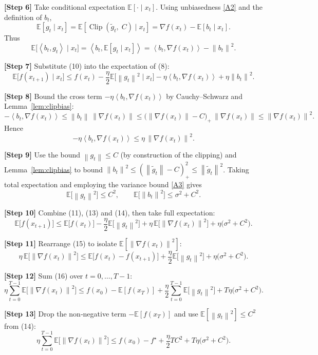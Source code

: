 \documentclass{article}
\newcommand{\clip}[2]{\operatorname{Clip}\!\left(#1,\;#2\right)}
\newcommand{\E}{\mathbb{E}}
\newcommand{\norm}[1]{\left\|#1\right\|}
\newcommand{\inner}[2]{\left\langle #1,#2\right\rangle}
\begin{document}
\noindent\textbf{[Step 6]} Take conditional expectation $\E[\cdot\mid x_t]$.
Using unbiasedness \eqref{A2} and the definition of $b_t$,
\[
\E[g_t\mid x_t]=\E[\clip{\tilde g_t}{C}\mid x_t]
= \nabla f(x_t)-\E[b_t\mid x_t].
\tag{9}
\]
Thus
\[
\E\big[\inner{b_t}{g_t}\mid x_t\big]
= \inner{b_t}{\E[g_t\mid x_t]}
= \inner{b_t}{\nabla f(x_t)}-\norm{b_t}^{2}.
\tag{10}
\]

\noindent\textbf{[Step 7]} Substitute (10) into the expectation of (8):
\[
\E\big[f(x_{t+1})\mid x_t\big]
\le f(x_t)-\frac{\eta}{2}\E\!\big[\norm{g_t}^{2}\mid x_t\big]
-\eta\inner{b_t}{\nabla f(x_t)}+\eta\norm{b_t}^{2}.
\tag{11}
\]

\noindent\textbf{[Step 8]} Bound the cross term $-\eta\inner{b_t}{\nabla f(x_t)}$
by Cauchy–Schwarz and Lemma~\ref{lem:clipbias}:
\[
-\inner{b_t}{\nabla f(x_t)}
\le \norm{b_t}\,\norm{\nabla f(x_t)}
\le \big(\norm{\nabla f(x_t)}-C\big)_{+}\,\norm{\nabla f(x_t)}
\le \norm{\nabla f(x_t)}^{2}.
\tag{12}
\]
Hence
\[
-\eta\inner{b_t}{\nabla f(x_t)}\le \eta\,\norm{\nabla f(x_t)}^{2}.
\tag{13}
\]

\noindent\textbf{[Step 9]} Use the bound $\norm{g_t}\le C$ (by construction of the clipping)
and Lemma~\ref{lem:clipbias} to bound $\norm{b_t}^{2}\le (\norm{\tilde g_t}-C)_{+}^{2}\le
\norm{\tilde g_t}^{2}$.
Taking total expectation and employing the variance bound \eqref{A3} gives
\[
\E\!\big[\norm{g_t}^{2}\big]\le C^{2},
\qquad
\E\!\big[\norm{b_t}^{2}\big]\le \sigma^{2}+C^{2}.
\tag{14}
\]

\noindent\textbf{[Step 10]} Combine (11), (13) and (14), then take full expectation:
\[
\E\big[f(x_{t+1})\big]
\le \E\big[f(x_t)\big]
-\frac{\eta}{2}\E\!\big[\norm{g_t}^{2}\big]
+\eta\,\E\!\big[\norm{\nabla f(x_t)}^{2}\big]
+\eta\big(\sigma^{2}+C^{2}\big).
\tag{15}
\]

\noindent\textbf{[Step 11]} Rearrange (15) to isolate $\E[\norm{\nabla f(x_t)}^{2}]$:
\[
\eta\,\E\!\big[\norm{\nabla f(x_t)}^{2}\big]
\le \E\big[f(x_t)-f(x_{t+1})\big]
+\frac{\eta}{2}\E\!\big[\norm{g_t}^{2}\big]
+\eta\big(\sigma^{2}+C^{2}\big).
\tag{16}
\]

\noindent\textbf{[Step 12]} Sum (16) over $t=0,\dots,T-1$:
\[
\eta\sum_{t=0}^{T-1}\E\!\big[\norm{\nabla f(x_t)}^{2}\big]
\le f(x_0)-\E[f(x_T)]
+\frac{\eta}{2}\sum_{t=0}^{T-1}\E\!\big[\norm{g_t}^{2}\big]
+T\eta\big(\sigma^{2}+C^{2}\big).
\tag{17}
\]

\noindent\textbf{[Step 13]} Drop the non‑negative term $-\E[f(x_T)]$ and use
$\E[\norm{g_t}^{2}]\le C^{2}$ from (14):
\[
\eta\sum_{t=0}^{T-1}\E\!\big[\norm{\nabla f(x_t)}^{2}\big]
\le f(x_0)-f^{\star}
+\frac{\eta}{2}TC^{2}+T\eta\big(\sigma^{2}+C^{2}\big).
\tag{18}
\]
\end{document}
